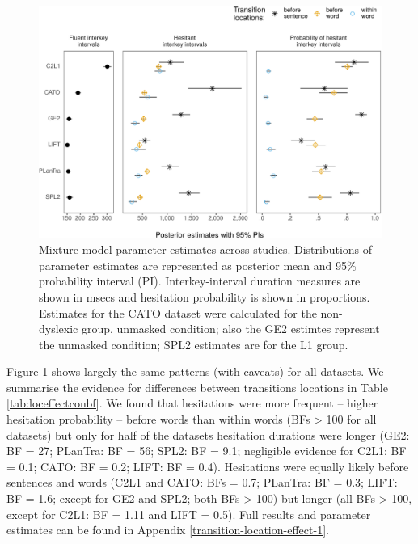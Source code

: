 \documentclass[
  man,floatsintext]{apa7}
\begin{document}
\begin{figure}

{\centering \includegraphics{manuscript_files/figure-latex/crossstudypost2-1} 

}

\caption{Mixture model parameter estimates across studies. Distributions of parameter estimates are represented as posterior mean and 95\% probability interval (PI). Interkey-interval duration measures are shown in msecs and hesitation probability is shown in proportions. Estimates for the CATO dataset were calculated for the non-dyslexic group, unmasked condition; also the GE2 estimtes represent the unmasked condition; SPL2 estimates are for the L1 group.}\label{fig:crossstudypost2}
\end{figure}

Figure \ref{fig:crossstudypost2} shows largely the same patterns (with caveats) for all datasets. We summarise the evidence for differences between transitions locations in Table \ref{tab:loceffectconbf}. We found that hesitations were more frequent -- higher hesitation probability -- before words than within words (BFs \textgreater{} 100 for all datasets) but only for half of the datasets hesitation durations were longer (GE2: BF = 27; PLanTra: BF = 56; SPL2: BF = 9.1; negligible evidence for C2L1: BF = 0.1; CATO: BF = 0.2; LIFT: BF = 0.4). Hesitations were equally likely before sentences and words (C2L1 and CATO: BFs = 0.7; PLanTra: BF = 0.3; LIFT: BF = 1.6; except for GE2 and SPL2; both BFs \textgreater{} 100) but longer (all BFs \textgreater{} 100, except for C2L1: BF = 1.11 and LIFT = 0.5). Full results and parameter estimates can be found in Appendix \ref{transition-location-effect-1}.
\end{document}
